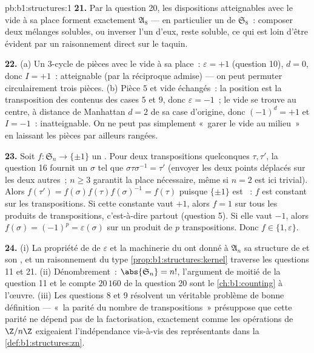 \begin{solution}{pb:b1:structures:1}
\textbf{21.} Par la question 20, les dispositions atteignables avec le
vide à sa place forment exactement $\mathfrak A_8$ --- en particulier un
\emph{} de $\mathfrak S_8$~: composer deux mélanges
solubles, ou inverser l'un d'eux, reste soluble, ce qui est loin d'être
évident par un raisonnement direct sur le taquin.

\textbf{22.} (a) Un $3$-cycle de pièces avec le vide à sa place~:
$\varepsilon = +1$ (question 10), $d = 0$, donc $I = +1$~: atteignable
(par la réciproque admise) --- on peut permuter circulairement trois
pièces. (b) Pièce $5$ et vide échangés~: la position est la
transposition des contenus des cases $5$ et $9$, donc $\varepsilon =
-1$~; le vide se trouve au centre, à distance de Manhattan $d = 2$ de
sa case d'origine, donc $(-1)^d = +1$ et $I = -1$~: inatteignable. On ne
peut pas simplement «~garer le vide au milieu~» en laissant les pièces
par ailleurs rangées.

\textbf{23.} Soit $f \colon \mathfrak S_n \to \{\pm1\}$ un
. Pour deux transpositions quelconques $\tau, \tau'$, la
question 16 fournit un $\sigma$ tel que $\sigma\tau\sigma^{-1} = \tau'$
(envoyer les deux points déplacés sur les deux autres~; $n \geq 3$
garantit la place nécessaire, même si $n = 2$ est ici trivial). Alors
$f(\tau') = f(\sigma)f(\tau)f(\sigma)^{-1} = f(\tau)$ puisque
$\{\pm1\}$ est ~: $f$ est constant sur les transpositions. Si
cette constante vaut $+1$, alors $f = 1$ sur tous les produits de
transpositions, c'est-à-dire partout (question 5). Si elle vaut $-1$,
alors $f(\sigma) = (-1)^p = \varepsilon(\sigma)$ sur un produit de $p$
transpositions. Donc $f \in \{1, \varepsilon\}$.

\textbf{24.} (i) La propriété de  de $\varepsilon$ et la
machinerie du  ont donné à $\mathfrak A_n$ sa structure de
 et son , et un raisonnement du type
\cref{prop:b1:structures:kernel} traverse les questions 11 et 21.
(ii) Dénombrement~: $\abs{\mathfrak S_n} = n!$, l'argument de moitié de
la question 11 et le compte $20\,160$ de la question 20 sont le
\cref{ch:b1:counting} à l'œuvre. (iii) Les questions 8 et 9 résolvent
un véritable problème de bonne définition --- «~la parité du nombre de
transpositions~» présuppose que cette parité ne dépend pas de la
factorisation, exactement comme les opérations de $\Z/n\Z$ exigeaient
l'indépendance vis-à-vis des représentants dans
la \cref{def:b1:structures:zn}.


\end{solution}
